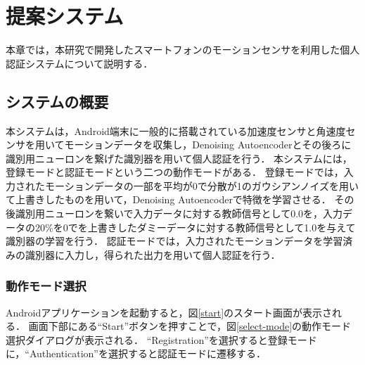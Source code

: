 \chapter{提案システム}
本章では，本研究で開発したスマートフォンのモーションセンサを利用した個人認証システムについて説明する．

\section{システムの概要}
本システムは，Android端末に一般的に搭載されている加速度センサと角速度センサを用いてモーションデータを収集し，Denoising Autoencoderとその後ろに識別用ニューロンを繋げた識別器を用いて個人認証を行う．
本システムには，登録モードと認証モードという二つの動作モードがある．
登録モードでは，入力されたモーションデータの一部を平均が0で分散が1のガウシアンノイズを用いて上書きしたものを用いて，Denoising Autoencoderで特徴を学習させる．
その後識別用ニューロンを繋いで入力データに対する教師信号として0.0を，入力データの20\%を0でを上書きしたダミーデータに対する教師信号として1.0を与えて識別器の学習を行う．
認証モードでは，入力されたモーションデータを学習済みの識別器に入力し，得られた出力を用いて個人認証を行う．

\subsection{動作モード選択}
Androidアプリケーションを起動すると，図\ref{start}のスタート画面が表示される．
画面下部にある``Start''ボタンを押すことで，図\ref{select-mode}の動作モード選択ダイアログが表示される．
``Registration''を選択すると登録モードに，``Authentication''を選択すると認証モードに遷移する．

